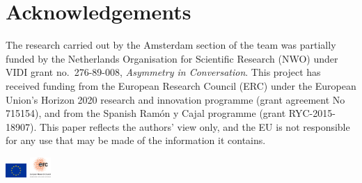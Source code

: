 \documentclass[11pt,a4paper]{article}
\begin{document}
\section*{Acknowledgements}
The research carried out by the Amsterdam section of the team was partially funded by the Netherlands Organisation for Scientific Research (NWO) under VIDI grant no.~276-89-008, {\em Asymmetry in Conversation}.
This project has received funding from the European Research Council (ERC) under the European Union’s Horizon 2020 research and innovation programme (grant agreement No 715154), and from the Spanish Ram\'on y Cajal programme (grant RYC-2015-18907). This paper reflects the authors' view only, and the EU is not responsible for any use that may be made of the information it contains.
\begin{flushright}
\includegraphics[width=0.8cm]{flag_yellow_low.jpeg}  
\includegraphics[width=0.8cm]{LOGO-ERC.jpg} 
\end{flushright}




\end{document}
